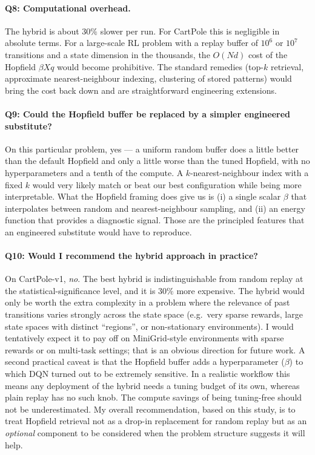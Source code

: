 \documentclass[a4paper,11pt]{article}
\begin{document}
\paragraph{Q8: Computational overhead.}
The hybrid is about $30\%$ slower per run. For CartPole this is
negligible in absolute terms. For a large-scale RL problem with a
replay buffer of $10^6$ or $10^7$ transitions and a state dimension in
the thousands, the $O(Nd)$ cost of the Hopfield $\beta X q$ would become
prohibitive. The standard remedies (top-$k$ retrieval, approximate
nearest-neighbour indexing, clustering of stored patterns) would bring
the cost back down and are straightforward engineering extensions.

\paragraph{Q9: Could the Hopfield buffer be replaced by a simpler engineered
substitute?}
On this particular problem, yes --- a uniform random buffer does a
little better than the default Hopfield and only a little worse than the
tuned Hopfield, with no hyperparameters and a tenth of the compute.
A $k$-nearest-neighbour index with a fixed $k$ would very likely match
or beat our best configuration while being more interpretable. What the
Hopfield framing does give us is (i) a single scalar $\beta$ that
interpolates between random and nearest-neighbour sampling, and (ii) an
energy function that provides a diagnostic signal. Those are the
principled features that an engineered substitute would have to
reproduce.

\paragraph{Q10: Would I recommend the hybrid approach in practice?}
On CartPole-v1, \emph{no}. The best hybrid is indistinguishable from
random replay at the statistical-significance level, and it is $30\%$
more expensive. The hybrid would only be worth the extra complexity in
a problem where the relevance of past transitions varies strongly across
the state space (e.g.\ very sparse rewards, large state spaces with
distinct ``regions'', or non-stationary environments). I would tentatively
expect it to pay off on MiniGrid-style environments with sparse rewards
or on multi-task settings; that is an obvious direction for future work.
A second practical caveat is that the Hopfield buffer adds a
hyperparameter ($\beta$) to which DQN turned out to be extremely
sensitive. In a realistic workflow this means any deployment of the
hybrid needs a tuning budget of its own, whereas plain replay has no
such knob. The compute savings of being tuning-free should not be
underestimated. My overall recommendation, based on this study, is to
treat Hopfield retrieval not as a drop-in replacement for random replay
but as an \emph{optional} component to be considered when the problem
structure suggests it will help.
\end{document}
